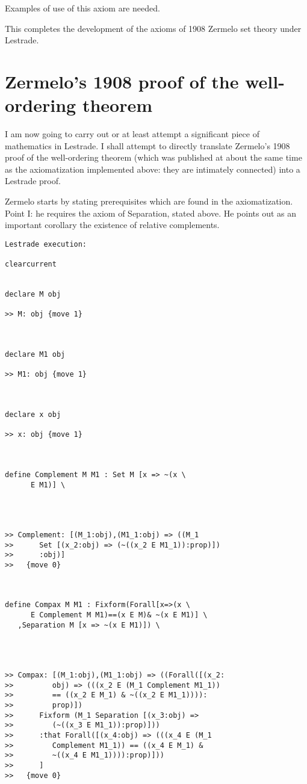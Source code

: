 \documentclass[12pt]{article}
\begin{document}
Examples of use of this axiom are needed.

This completes the development of the axioms of 1908 Zermelo set theory under Lestrade.

\section{Zermelo's 1908 proof of the well-ordering theorem}

I am now going to carry out or at least attempt a significant piece of mathematics in Lestrade.  I shall attempt to directly translate Zermelo's 1908 proof of the well-ordering theorem
(which was published at about the same time as the axiomatization implemented above:  they are intimately connected) into a Lestrade proof.

Zermelo starts by stating prerequisites which are found in the axiomatization.  Point I:  he requires the axiom of Separation, stated above.  He points out as an important corollary the existence of
relative complements.

\begin{verbatim}Lestrade execution:

clearcurrent


declare M obj

>> M: obj {move 1}



declare M1 obj

>> M1: obj {move 1}



declare x obj

>> x: obj {move 1}



define Complement M M1 : Set M [x => ~(x \
      E M1)] \
   



>> Complement: [(M_1:obj),(M1_1:obj) => ((M_1
>>      Set [(x_2:obj) => (~((x_2 E M1_1)):prop)])
>>      :obj)]
>>   {move 0}



define Compax M M1 : Fixform(Forall[x=>(x \
      E Complement M M1)==(x E M)& ~(x E M1)] \
   ,Separation M [x => ~(x E M1)]) \
   



>> Compax: [(M_1:obj),(M1_1:obj) => ((Forall([(x_2:
>>         obj) => (((x_2 E (M_1 Complement M1_1))
>>         == ((x_2 E M_1) & ~((x_2 E M1_1)))):
>>         prop)])
>>      Fixform (M_1 Separation [(x_3:obj) =>
>>         (~((x_3 E M1_1)):prop)]))
>>      :that Forall([(x_4:obj) => (((x_4 E (M_1
>>         Complement M1_1)) == ((x_4 E M_1) &
>>         ~((x_4 E M1_1)))):prop)]))
>>      ]
>>   {move 0}


\end{verbatim}
\end{document}
